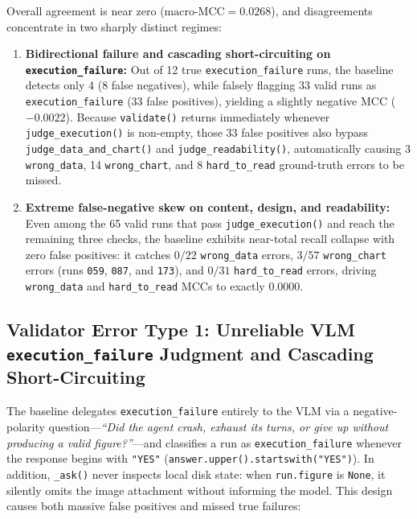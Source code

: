 \documentclass[11pt]{article}
\begin{document}
Overall agreement is near zero ($\text{macro-MCC} = 0.0268$), and disagreements concentrate in two sharply distinct regimes:
\begin{enumerate}
    \item \textbf{Bidirectional failure and cascading short-circuiting on \texttt{execution\_failure}:} Out of 12 true \texttt{execution\_failure} runs, the baseline detects only 4 (8 false negatives), while falsely flagging 33 valid runs as \texttt{execution\_failure} (33 false positives), yielding a slightly negative MCC ($-0.0022$). Because \texttt{validate()} returns immediately whenever \texttt{judge\_execution()} is non-empty, those 33 false positives also bypass \texttt{judge\_data\_and\_chart()} and \texttt{judge\_readability()}, automatically causing 3 \texttt{wrong\_data}, 14 \texttt{wrong\_chart}, and 8 \texttt{hard\_to\_read} ground-truth errors to be missed.
    \item \textbf{Extreme false-negative skew on content, design, and readability:} Even among the 65 valid runs that pass \texttt{judge\_execution()} and reach the remaining three checks, the baseline exhibits near-total recall collapse with zero false positives: it catches $0/22$ \texttt{wrong\_data} errors, $3/57$ \texttt{wrong\_chart} errors (runs \texttt{059}, \texttt{087}, and \texttt{173}), and $0/31$ \texttt{hard\_to\_read} errors, driving \texttt{wrong\_data} and \texttt{hard\_to\_read} MCCs to exactly $0.0000$.
\end{enumerate}

\subsection{Validator Error Type 1: Unreliable VLM \texttt{execution\_failure} Judgment and Cascading Short-Circuiting}
The baseline delegates \texttt{execution\_failure} entirely to the VLM via a negative-polarity question---\textit{``Did the agent crash, exhaust its turns, or give up without producing a valid figure?''}---and classifies a run as \texttt{execution\_failure} whenever the response begins with \texttt{"YES"} (\texttt{answer.upper().startswith("YES")}). In addition, \texttt{\_ask()} never inspects local disk state: when \texttt{run.figure} is \texttt{None}, it silently omits the image attachment without informing the model. This design causes both massive false positives and missed true failures:
\end{document}
